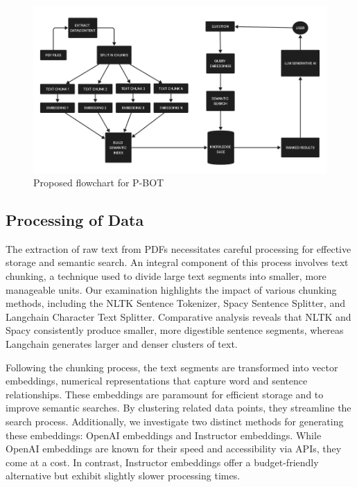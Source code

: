 \documentclass[conference]{IEEEtran}
\begin{document}
\begin{figure}
    \centering
    \includegraphics[width=\textwidth]{FLOWC}
    \caption{Proposed flowchart for P-BOT}
    \label{fig:your_image_label}
\end{figure}

\subsection{Processing of Data}

The extraction of raw text from PDFs necessitates careful processing for effective storage and semantic search. An integral component of this process involves text chunking, a technique used to divide large text segments into smaller, more manageable units. Our examination highlights the impact of various chunking methods, including the NLTK Sentence Tokenizer, Spacy Sentence Splitter, and Langchain Character Text Splitter. Comparative analysis reveals that NLTK and Spacy consistently produce smaller, more digestible sentence segments, whereas Langchain generates larger and denser clusters of text.

Following the chunking process, the text segments are transformed into vector embeddings, numerical representations that capture word and sentence relationships. These embeddings are paramount for efficient storage and to improve semantic searches. By clustering related data points, they streamline the search process. Additionally, we investigate two distinct methods for generating these embeddings: OpenAI embeddings and Instructor embeddings. While OpenAI embeddings are known for their speed and accessibility via APIs, they come at a cost. In contrast, Instructor embeddings offer a budget-friendly alternative but exhibit slightly slower processing times.
\end{document}
